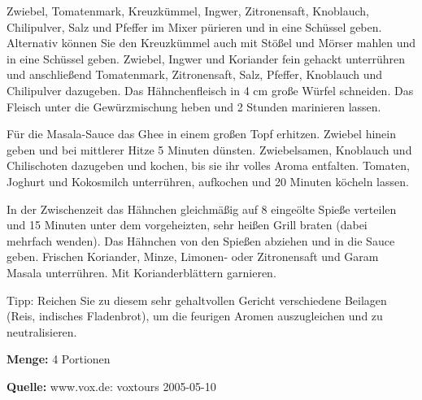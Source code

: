 {Zwiebel, Tomatenmark, Kreuzkümmel, Ingwer, Zitronensaft, Knoblauch, Chilipulver, Salz und Pfeffer im Mixer pürieren und in eine Schüssel geben. Alternativ können Sie den Kreuzkümmel auch mit Stößel und Mörser mahlen und in eine Schüssel geben.
Zwiebel, Ingwer und Koriander fein gehackt unterrühren und anschließend Tomatenmark, Zitronensaft, Salz, Pfeffer, Knoblauch und Chilipulver dazugeben.
Das Hähnchenfleisch in 4 cm große Würfel schneiden. Das Fleisch unter die Gewürzmischung heben und 2 Stunden marinieren lassen.

Für die Masala-Sauce das Ghee in einem großen Topf erhitzen. Zwiebel hinein geben und bei mittlerer Hitze 5 Minuten dünsten. Zwiebelsamen, Knoblauch und Chilischoten dazugeben und kochen, bis sie ihr volles Aroma entfalten.
Tomaten, Joghurt und Kokosmilch unterrühren, aufkochen und 20 Minuten köcheln lassen.

In der Zwischenzeit das Hähnchen gleichmäßig auf 8 eingeölte Spieße verteilen und 15 Minuten unter dem vorgeheizten, sehr heißen Grill braten (dabei mehrfach wenden).
Das Hähnchen von den Spießen abziehen und in die Sauce geben. Frischen Koriander, Minze, Limonen- oder Zitronensaft und Garam Masala unterrühren. Mit Korianderblättern garnieren.

Tipp: Reichen Sie zu diesem sehr gehaltvollen Gericht verschiedene Beilagen (Reis,
indisches Fladenbrot), um die feurigen Aromen auszugleichen und zu neutralisieren.


{\bfseries Menge:} 4 Portionen

{\bfseries Quelle:} www.vox.de: voxtours 2005-05-10 

} 

